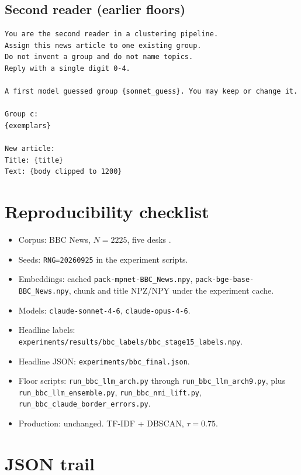 \documentclass[11pt,a4paper]{article}
\begin{document}
\subsection{Second reader (earlier floors)}

\begin{verbatim}
You are the second reader in a clustering pipeline.
Assign this news article to one existing group.
Do not invent a group and do not name topics.
Reply with a single digit 0-4.

A first model guessed group {sonnet_guess}. You may keep or change it.

Group c:
{exemplars}

New article:
Title: {title}
Text: {body clipped to 1200}
\end{verbatim}

\section{Reproducibility checklist}

\begin{itemize}
\item Corpus: BBC News, $N=2225$, five desks \cite{greene2006bbc}.
\item Seeds: \texttt{RNG=20260925} in the experiment scripts.
\item Embeddings: cached \texttt{pack-mpnet-BBC\_News.npy},
      \texttt{pack-bge-base-BBC\_News.npy}, chunk and title
      NPZ/NPY under the experiment cache.
\item Models: \texttt{claude-sonnet-4-6},
      \texttt{claude-opus-4-6}.
\item Headline labels:
      \texttt{experiments/results/bbc\_labels/bbc\_stage15\_labels.npy}.
\item Headline JSON: \texttt{experiments/bbc\_final.json}.
\item Floor scripts: \texttt{run\_bbc\_llm\_arch.py} through
      \texttt{run\_bbc\_llm\_arch9.py}, plus
      \texttt{run\_bbc\_llm\_ensemble.py},
      \texttt{run\_bbc\_nmi\_lift.py},
      \texttt{run\_bbc\_claude\_border\_errors.py}.
\item Production: unchanged. TF-IDF + DBSCAN, $\tau=0.75$.
\end{itemize}

\section{JSON trail}
\end{document}
